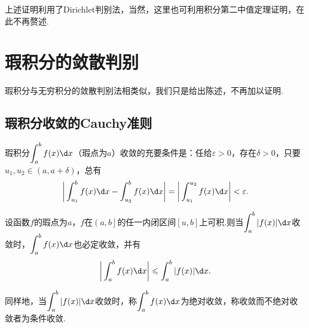 \hspace*{\fill}

\begin{remark}
	上述证明利用了Dirichlet判别法，当然，这里也可利用积分第二中值定理证明，在此不再赘述.
\end{remark}
\section{瑕积分的敛散判别}
瑕积分与无穷积分的敛散判别法相类似，我们只是给出陈述，不再加以证明.
\subsection{瑕积分收敛的Cauchy准则}
\begin{theorem}[瑕积分收敛的Cauchy准则]
	瑕积分$\displaystyle\int_{a}^{b}f(x)\d x$（瑕点为$a$）收敛的充要条件是：任给$\varepsilon>0$，存在$\delta>0$，只要$u_1,u_2\in(a,a+\delta)$，总有
	$$\bigg|\int_{u_1}^{b}f(x)\d x-\int_{u_2}^{b}f(x)\d x\bigg|=\bigg|\int_{u_1}^{u_2}f(x)\d x\bigg|<\varepsilon.$$
\end{theorem}
\begin{proposition}
	设函数$f$的瑕点为$a$，$f$在$\left(a,b\right]$的任一内闭区间$\left[u,b\right]$上可积.则当$\displaystyle\int_{a}^{b}|f(x)|\d x$收敛时，$\displaystyle\int_{a}^{b}f(x)\d x$也必定收敛，并有
	$$\bigg|\int_{a}^{b}f(x)\d x\bigg|\leqslant\int_{a}^{b}|f(x)|\d x.$$
\end{proposition}
\begin{remark}
	同样地，当$\displaystyle\int_{a}^{b}|f(x)|\d x$收敛时，称$\displaystyle\int_{a}^{b}f(x)\d x$为{\heiti 绝对收敛}，称收敛而不绝对收敛者为{\heiti 条件收敛}.
\end{remark}
